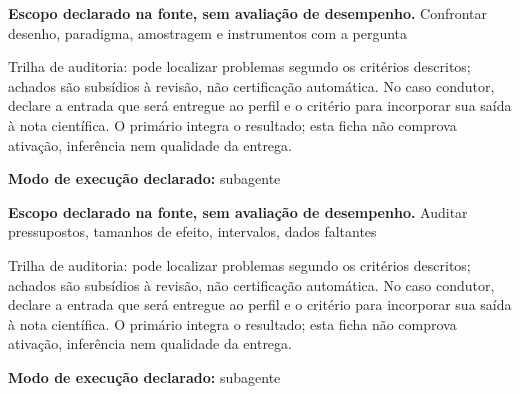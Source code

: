 
\begin{descricao}
\textbf{Escopo declarado na fonte, sem avaliação de desempenho.}
Confrontar desenho, paradigma, amostragem e instrumentos com a pergunta
\end{descricao}

\begin{funcao}
Trilha de auditoria: pode localizar problemas segundo os critérios descritos; achados são subsídios à revisão, não certificação automática. No caso condutor, declare a entrada que será entregue ao perfil e o critério para incorporar sua saída à nota científica. O primário integra o resultado; esta ficha não comprova ativação, inferência nem qualidade da entrega.
\end{funcao}

\begin{arquitetura}
\textbf{Modo de execução declarado:} subagente
\end{arquitetura}


\begin{descricao}
\textbf{Escopo declarado na fonte, sem avaliação de desempenho.}
Auditar pressupostos, tamanhos de efeito, intervalos, dados faltantes
\end{descricao}

\begin{funcao}
Trilha de auditoria: pode localizar problemas segundo os critérios descritos; achados são subsídios à revisão, não certificação automática. No caso condutor, declare a entrada que será entregue ao perfil e o critério para incorporar sua saída à nota científica. O primário integra o resultado; esta ficha não comprova ativação, inferência nem qualidade da entrega.
\end{funcao}

\begin{arquitetura}
\textbf{Modo de execução declarado:} subagente
\end{arquitetura}

